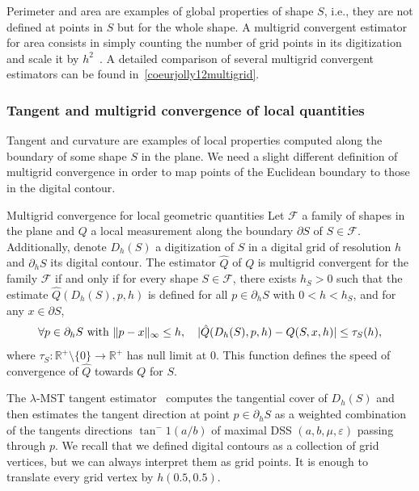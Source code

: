 Perimeter and area are examples of global properties of shape $S$, i.e., they are not defined at points in $S$ but for the whole shape. A multigrid convergent estimator for area consists in simply counting the number of grid points in its digitization and scale it by $h^2$~\cite{klette00multigrid}. A detailed comparison of several multigrid convergent estimators can be found in~\cref{coeurjolly12multigrid}.


\subsubsection{Tangent and multigrid convergence of local quantities}

Tangent and curvature are examples of local properties computed along the boundary of some shape $S$ in the plane. We need a slight different definition of multigrid convergence in order to map points of the Euclidean boundary to those in the digital contour.

\begin{definition}{Multigrid convergence for local geometric quantities}
Let $\mathcal{F}$ a family of shapes in the plane and $Q$ a local measurement along the boundary $\partial S$ of $S \in \mathcal{F}$. Additionally, denote $D_h(S)$ a digitization of $S$ in a digital grid of resolution $h$ and $\partial_h S$ its digital contour. The estimator $\hat{Q}$ of $Q$ is multigrid convergent for the family $\mathcal{F}$ if and only if for every shape $S \in \mathcal{F}$, there exists $h_S > 0$ such that the estimate $\hat{Q}(D_h(S),p,h)$ is defined for all $p \in \partial_h S$ with $0 < h < h_S$, and for any $x \in \partial S$,
\begin{align*}
	\forall p \in \partial_h S \text{ with } \lVert p-x\rVert_{\infty} \leq h,\quad | \hat{Q}(D_h(S),p,h) - Q(S,x,h) | \leq \tau_S(h),	
\end{align*}
where $\tau_S:\mathbb{R}^+\setminus \{0\} \rightarrow \mathbb{R}^+$ has null limit at $0$. This function defines the speed of convergence of $\hat{Q}$ towards $Q$ for $S$.
\end{definition}


The $\lambda$-MST tangent estimator~\cite{lachaud07tangent} computes the tangential cover of $D_h(S)$ and then estimates the tangent direction at point $p \in \partial_h S$ as a weighted combination of the tangents directions $\tan^-1(a/b)$  of maximal DSS $(a,b,\mu,\varepsilon)$ passing through $p$. We recall that we defined digital contours as a collection of grid vertices, but we can always interpret them as grid points. It is enough to translate every grid vertex by $h(0.5,0.5)$.

